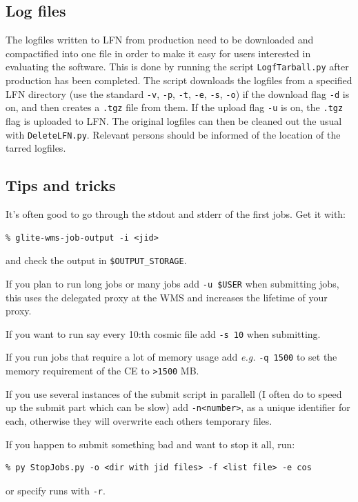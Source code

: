 \documentclass[11pt]{article}
\begin{document}
\subsection{Log files}

The logfiles written to LFN from production need to be downloaded and
compactified into one file in order to make it easy for users
interested in evaluating the software. This is done by running the
script \verb+LogfTarball.py+ after production has been completed. The
script downloads the logfiles from a specified LFN directory (use the
standard \verb+-v+, \verb+-p+, \verb+-t+, \verb+-e+, \verb+-s+,
\verb+-o+) if the download flag \verb+-d+ is on, and then creates a
\verb+.tgz+ file from them. If the upload flag \verb+-u+ is on, the
\verb+.tgz+ flag is uploaded to LFN. The original logfiles can then be
cleaned out the usual with \verb+DeleteLFN.py+. Relevant persons
should be informed of the location of the tarred logfiles.


\subsection{Tips and tricks}

It's often good to go through the stdout and stderr of the first jobs. Get it with:
\begin{verbatim}
% glite-wms-job-output -i <jid>
\end{verbatim}
and check the output in \verb+$OUTPUT_STORAGE+.

If you plan to run long jobs or many jobs add \verb+-u $USER+ when
submitting jobs, this uses the delegated proxy at the WMS and
increases the lifetime of your proxy.

If you want to run say every 10:th cosmic file add \verb+-s 10+ when submitting.

If you run jobs that require a lot of memory usage add \textit{e.g.}
\verb+-q 1500+ to set the memory requirement of the CE to \verb+>1500+ MB.

If you use several instances of the submit script in parallell (I
often do to speed up the submit part which can be slow) add
\verb+-n<number>+,
as a unique identifier for each, otherwise they will
overwrite each others temporary files. 

If you happen to submit something bad and want to stop it all, run:
\begin{verbatim}
% py StopJobs.py -o <dir with jid files> -f <list file> -e cos
\end{verbatim}
or specify runs with \verb+-r+.
\end{document}
